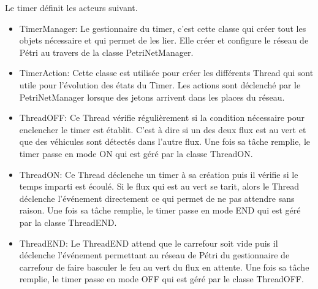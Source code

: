 Le timer définit les acteurs suivant.

\begin{itemize}
\item TimerManager: Le gestionnaire du timer, c'est cette classe qui créer tout les objets nécessaire et qui permet de les lier. Elle créer et configure le réseau de Pétri au travers de la classe PetriNetManager.
\item TimerAction: Cette classe est utilisée pour créer les différents Thread qui sont utile pour l'évolution des états du Timer. Les actions sont déclenché par le PetriNetManager lorsque des jetons arrivent dans les places du réseau.
\item ThreadOFF: Ce Thread vérifie régulièrement si la condition nécessaire pour enclencher le timer est établit. C'est à dire si un des deux flux est au vert et que des véhicules sont détectés dans l'autre flux. Une fois sa tâche remplie, le timer passe en mode ON qui est géré par la classe ThreadON.
\item ThreadON: Ce Thread déclenche un timer à sa création puis il vérifie si le temps imparti est écoulé. Si le flux qui est au vert se tarit, alors le Thread déclenche l'événement directement ce qui permet de ne pas attendre sans raison. Une fois sa tâche remplie, le timer passe en mode END qui est géré par la classe ThreadEND.
\item ThreadEND: Le ThreadEND attend que le carrefour soit vide puis il déclenche l'événement permettant au réseau de Pétri du gestionnaire de carrefour de faire basculer le feu au vert du flux en attente. Une fois sa tâche remplie, le timer passe en mode OFF qui est géré par le classe ThreadOFF.
\end{itemize}
